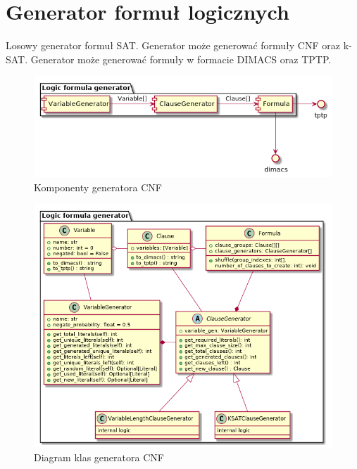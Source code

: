 \documentclass[a4paper,12pt]{article}
\begin{document}
\section{Generator formuł logicznych} \label{LFG}

Losowy generator formuł SAT. Generator może generować formuły \gls{CNF} oraz \gls{k-SAT}. Generator może generować formuły w formacie DIMACS oraz TPTP.

\begin{figure}[H]
  \centering
  \includegraphics[scale=0.7]{logic-formula-generator/components.png}
  \caption{Komponenty generatora CNF}
\end{figure}

\begin{figure}[H]
  \centering
  \includegraphics[scale=0.7]{logic-formula-generator/cnf_class_diagram.png}
  \caption{Diagram klas generatora CNF}
\end{figure}
\end{document}
